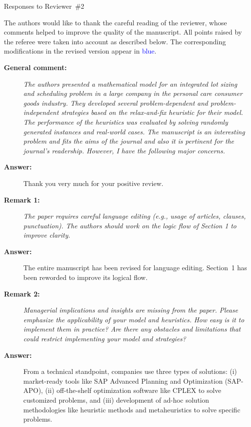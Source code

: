\documentclass[11pt]{article}
\begin{document}
\begin{center}
{\Large Responses to Reviewer~\#2}
\end{center}

\vspace{1cm}

The authors would like to thank the careful reading of the reviewer, whose comments helped  to improve the quality of the manuscript. All points raised by the referee were taken into account as described below. The corresponding modifications in the revised version appear in \textcolor{blue}{blue}.

\noindent
\textbf{\Large }

\begin{description}
  
\item[\textbf{General comment:}] \textit{The authors presented a mathematical model for an integrated lot sizing and scheduling problem in a large company in the personal care consumer goods industry. They developed several problem-dependent and problem-independent strategies based on the relax-and-fix heuristic for their model. The performance of the heuristics was evaluated by solving randomly generated instances and real-world cases. The manuscript is an interesting problem and fits the aims of the journal and also it is pertinent for the journal's readership. However, I have the following major concerns.}

\item[\textbf{Answer:}] Thank you very much for your positive review.

\item[\textbf{Remark 1:}] \textit{The paper requires careful language editing (e.g., usage of articles, clauses, punctuation). The authors should work on the logic flow of Section 1 to improve clarity.}

\item[\textbf{Answer:}] The entire manuscript has been revised for language editing. Section~1 has been reworded to improve its logical flow.

\item[\textbf{Remark 2:}] \textit{Managerial implications and insights are missing from the paper. Please emphasize the applicability of your model and heuristics. How easy is it to implement them in practice? Are there any obstacles and limitations that could restrict implementing your model and strategies?}

\item[\textbf{Answer:}] From a technical standpoint, companies use three types of solutions: (i) market-ready tools like SAP Advanced Planning and Optimization (SAP-APO), (ii) off-the-shelf optimization software like CPLEX to solve customized problems, and (iii) development of ad-hoc solution methodologies like heuristic methods and metaheuristics to solve specific problems.


\end{description}
\end{document}
